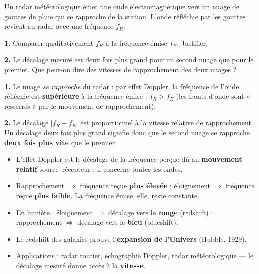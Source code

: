 \documentclass[11pt]{article}
\newcommand{\cle}[1]{{\popxbold\color{popdark}#1}}
\begin{document}
\begin{exercice}
Un radar météorologique émet une onde électromagnétique vers un nuage de gouttes de pluie qui se rapproche de la station. L'onde réfléchie par les gouttes revient au radar avec une fréquence $f_R$.

\textbf{1.} Comparer qualitativement $f_R$ à la fréquence émise $f_E$. Justifier.

\textbf{2.} Le décalage mesuré est deux fois plus grand pour un second nuage que pour le premier. Que peut-on dire des vitesses de rapprochement des deux nuages ?
\end{exercice}

\begin{corrige}[Exercice 1]
\textbf{1.} Le nuage \emph{se rapproche} du radar : par effet Doppler, la fréquence de l'onde réfléchie est \textbf{supérieure} à la fréquence émise : $f_R > f_E$ (les fronts d'onde sont « resserrés » par le mouvement de rapprochement).

\textbf{2.} Le décalage $|f_R - f_E|$ est proportionnel à la vitesse relative de rapprochement. Un décalage deux fois plus grand signifie donc que le second nuage se rapproche \textbf{deux fois plus vite} que le premier.
\end{corrige}

\begin{aretenir}
\begin{itemize}
\item L'\cle{effet Doppler} est le décalage de la fréquence perçue dû au \textbf{mouvement relatif} source--récepteur ; il concerne toutes les ondes.
\item Rapprochement $\Rightarrow$ fréquence reçue \textbf{plus élevée} ; éloignement $\Rightarrow$ fréquence reçue \textbf{plus faible}. La fréquence émise, elle, reste constante.
\item En lumière : éloignement $\Rightarrow$ décalage vers le \textbf{rouge} (redshift) ; rapprochement $\Rightarrow$ décalage vers le \textbf{bleu} (blueshift).
\item Le redshift des galaxies prouve l'\textbf{expansion de l'Univers} (Hubble, 1929).
\item Applications : radar routier, échographie Doppler, radar météorologique — le décalage mesuré donne accès à la \textbf{vitesse}.
\end{itemize}
\end{aretenir}

\newpage
\end{document}
